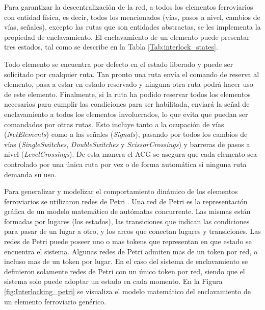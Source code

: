 	Para garantizar la descentralización de la red, a todos los elementos ferroviarios con entidad física, es decir, todos los mencionados (vías, pasos a nivel, cambios de vías, señales), excepto las rutas que son entidades abstractas, se les implementa la propiedad de enclavamiento. El enclavamiento de un elemento puede presentar tres estados, tal como se describe en la Tabla \ref{Tab:interlock_states}.
	
		\begin{table}[!h]
		{
			\caption{Estados de enclavamiento de cada elemento ferroviario.}
			\label{Tab:interlock_states}
			\centering
		}
		\end{table}
	
	Todo elemento se encuentra por defecto en el estado liberado y puede ser solicitado por cualquier ruta. Tan pronto una ruta envía el comando de reserva al elemento, pasa a estar en estado reservado y ninguna otra ruta podrá hacer uso de este elemento. Finalmente, si la ruta ha podido reservar todos los elementos necesarios para cumplir las condiciones para ser habilitada, enviará la señal de enclavamiento a todos los elementos involucrados, lo que evita que puedan ser comandados por otras rutas. Esto incluye tanto a la ocupación de vías (\textit{NetElements}) como a las señales (\textit{Signals}), pasando por todos los cambios de vías (\textit{SingleSwitches}, \textit{DoubleSwitches} y \textit{ScissorCrossings}) y barreras de pasos a nivel (\textit{LevelCrossings}). De esta manera el ACG se asegura que cada elemento sea controlado por una única ruta por vez o de forma automática si ninguna ruta demanda su uso.
	
	Para generalizar y modelizar el comportamiento dinámico de los elementos ferroviarios se utilizaron redes de Petri \cite{Paper_64,Paper_65,Paper_88,Paper_94,Paper_95,Paper_123,Paper_196}. Una red de Petri es la representación gráfica de un modelo matemático de autómatas concurrente. Las mismas están formadas por lugares (los estados), las transiciones que indican las condiciones para pasar de un lugar a otro, y los arcos que conectan lugares y transiciones. Las redes de Petri puede poseer uno o mas tokens que representan en que estado se encuentra el sistema. Algunas redes de Petri admiten mas de un token por red, o incluso mas de un token por lugar. En el caso del sistema de enclavamiento se definieron solamente redes de Petri con un único token por red, siendo que el sistema solo puede adoptar un estado en cada momento. En la Figura \ref{fig:Interlocking_petri} se visualiza el modelo matemático del enclavamiento de un elemento ferroviario genérico.
	
